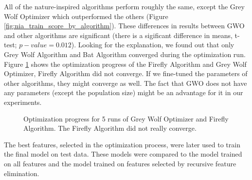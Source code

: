 \documentclass[runningheads]{llncs}
\begin{document}
All of the nature-inspired algorithms perform roughly the same, except the Grey Wolf Optimizer which outperformed the others (Figure \ref{fig:nia_train_score_by_algorithm}). These differences in results between GWO and other algorithms are significant (there is a sigificant difference in means, t-test; $p-value=0.012$). Looking for the explanation, we found out that only Grey Wolf Algorithm and Bat Algorithm converged during the optimization run. Figure \ref{fig:nia_scores_by_run} shows the optimization progress of the Firefly Algorithm and Grey Wolf Optimizer, Firefly Algorithm did not converge. If we fine-tuned the parameters of other algorithms, they might converge as well. The fact that GWO does not have any parameters (except the population size) might be an advantage for it in our experiments.


\begin{figure}
    \centering
    \qquad
    \caption{Optimization progress for 5 runs of Grey Wolf Optimizer and Firefly Algorithm. The Firefly Algorithm did not really converge.}
    \label{fig:nia_scores_by_run}
\end{figure}

The best features, selected in the optimization process, were later used to train the final model on test data. These models were compared to the model trained on all features and the model trained on features selected by recursive feature elimination.
\end{document}
